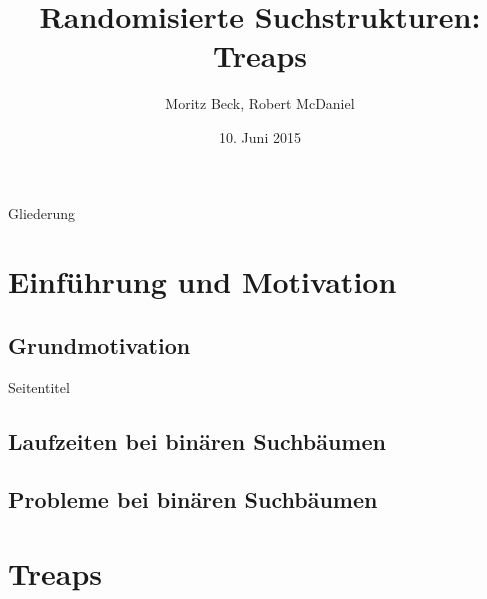 \documentclass[t]{beamer}
\title[Treaps]{Randomisierte Suchstrukturen: Treaps}
\author[M. Beck, R.McDaniel]{Moritz Beck, Robert McDaniel}
\date[10.06.2015]{10. Juni 2015}
\theoremstyle{plain}
\begin{document}
{

\begin{frame}%
    \titlepage
\end{frame}

\begin{frame}{Gliederung}
    \tableofcontents
\end{frame}
}

\section{Einführung und Motivation}
\subsection{Grundmotivation}
\begin{frame}{Seitentitel}
    
\end{frame}
\subsection{Laufzeiten bei binären Suchbäumen}
\begin{frame}
    
\end{frame}
\subsection{Probleme bei binären Suchbäumen}
\begin{frame}
    
\end{frame}


\section{Treaps}
\end{document}
